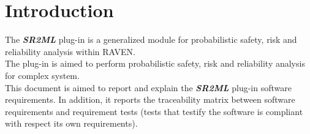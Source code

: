 \section{Introduction}
The \textbf{\textit{SR2ML}} plug-in is a generalized module for probabilistic safety, risk and reliability analysis within RAVEN.
\\The plug-in is aimed to perform probabilistic safety, risk and reliability analysis for complex system.
\\This document is aimed to report and explain the  \textbf{\textit{SR2ML}} plug-in software requirements. In addition, it reports
the traceability matrix between software requirements and requirement tests (tests that testify the software is compliant
with respect its own requirements).
